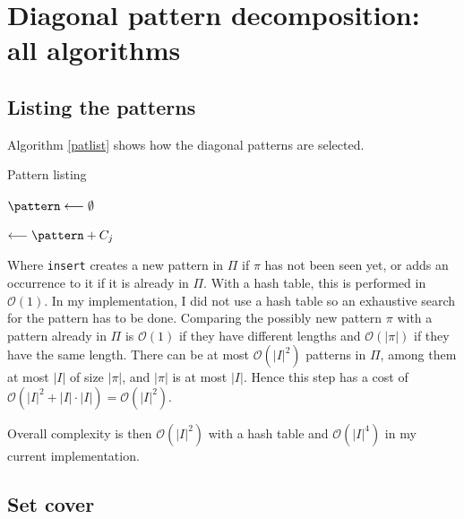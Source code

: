 \documentclass[a4paper,10pt]{article}
\newcommand{\bigO}[1]{\mathcal O\left( #1 \right)}
\begin{document}
\newpage
\section{Diagonal pattern decomposition: all algorithms}

\subsection*{Listing the patterns}

Algorithm \ref{patlist} shows how the diagonal patterns are selected.

\begin{algorithm}
\caption{Pattern listing \label{patlist}}
    
 


\Debut
{
	 {
		$\pattern \longleftarrow \emptyset$
		
		 {
			 {
				\pattern $\longleftarrow \pattern + C_j$
			}
		}
	}

	\Retour \Pat
}
\end{algorithm}

Where \texttt{insert} creates a new pattern in $\Pi$ if $\pi$ has not been seen yet, or adds an occurrence to it if it is already in $\Pi$. With a hash table, this is performed in $\bigO{1}$. In my implementation, I did not use a hash table so an exhaustive search for the pattern has to be done. Comparing the possibly new pattern $\pi$ with a pattern already in $\Pi$ is $\bigO{1}$ if they have different lengths and $\bigO{|\pi|}$ if they have the same length. There can be at most $\bigO{|I|^2}$ patterns in $\Pi$, among them at most $|I|$ of size $|\pi|$, and $|\pi|$ is at most $|I|$. Hence this step has a cost of $\bigO{|I|^2+|I|\cdot|I|}=\bigO{|I|^2}$.

Overall complexity is then $\bigO{|I|^2}$ with a hash table and $\bigO{|I|^4}$ in my current implementation.


\subsection*{Set cover}
\end{document}
